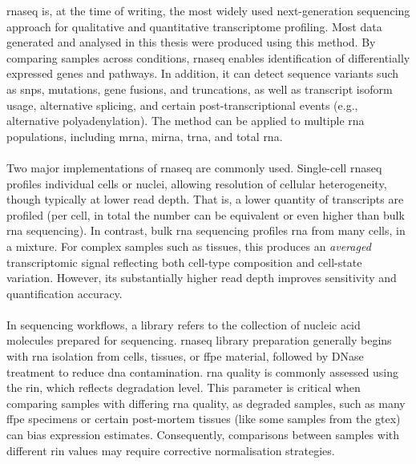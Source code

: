 \gls{rnaseq} is, at the time of writing, the most widely used next-generation sequencing approach for qualitative and quantitative transcriptome profiling. Most data generated and analysed in this thesis were produced using this method. By comparing samples across conditions, \gls{rnaseq} enables identification of differentially expressed genes and pathways\cite{chu_rna_2012}. In addition, it can detect sequence variants such as \glspl{snp}, mutations, gene fusions, and truncations, as well as transcript isoform usage, alternative splicing, and certain post-transcriptional events (e.g., alternative polyadenylation)\cite{chu_rna_2012}. The method can be applied to multiple \gls{rna} populations, including \gls{mrna}, \gls{mirna}, \gls{trna}, and total \gls{rna}\cite{chu_rna_2012}.
\\
\\
Two major implementations of \gls{rnaseq} are commonly used. Single-cell \gls{rnaseq} profiles individual cells or nuclei, allowing resolution of cellular heterogeneity, though typically at lower read depth. That is, a lower quantity of transcripts are profiled (per cell, in total the number can be equivalent or even higher than bulk \gls{rna} sequencing)\cite{kolodziejczyk_technology_2015}. In contrast, bulk \gls{rna} sequencing profiles \gls{rna} from many cells, in a mixture\cite{kolodziejczyk_technology_2015, newman_robust_2015}. For complex samples such as tissues, this produces an \textit{averaged} transcriptomic signal reflecting both cell-type composition and cell-state variation\cite{kolodziejczyk_technology_2015, newman_robust_2015}. However, its substantially higher read depth improves sensitivity and quantification accuracy\cite{newman_robust_2015}.
\\
\\
In sequencing workflows, a library refers to the collection of nucleic acid molecules prepared for sequencing\cite{chu_rna_2012}. \gls{rnaseq} library preparation generally begins with \gls{rna} isolation from cells, tissues, or \gls{ffpe} material, followed by DNase treatment to reduce \gls{dna} contamination\cite{chu_rna_2012}. \gls{rna} quality is commonly assessed using the \gls{rin}, which reflects degradation level\cite{chu_rna_2012}. This parameter is critical when comparing samples with differing \gls{rna} quality, as degraded samples, such as many \gls{ffpe} specimens or certain post-mortem tissues (like some samples from the \gls{gtex}) can bias expression estimates\cite{schneider_voyager_2024}. Consequently, comparisons between samples with different \gls{rin} values may require corrective normalisation strategies\cite{schneider_voyager_2024}.
